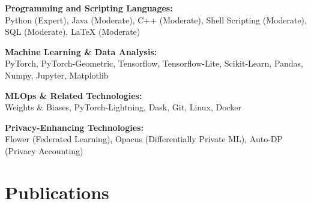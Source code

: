 \documentclass[11pt]{article}
\begin{document}
\begin{outerlist}
	\item \textbf{Programming and Scripting Languages:}\\
	{Python (Expert), Java (Moderate), C++ (Moderate), Shell Scripting (Moderate), SQL (Moderate), LaTeX (Moderate)}

	\item \textbf{Machine Learning \& Data Analysis:}\\
	{PyTorch, PyTorch-Geometric, Tensorflow, Tensorflow-Lite, Scikit-Learn, Pandas, Numpy, Jupyter, Matplotlib}

	\item \textbf{MLOps \& Related Technologies:}\\
	{Weights \& Biases, PyTorch-Lightning, Dask, Git, Linux, Docker}

	\item \textbf{Privacy-Enhancing Technologies:}\\
	{Flower (Federated Learning), Opacus (Differentially Private ML), Auto-DP (Privacy Accounting)}

\end{outerlist}


\section{Publications}
\end{document}
